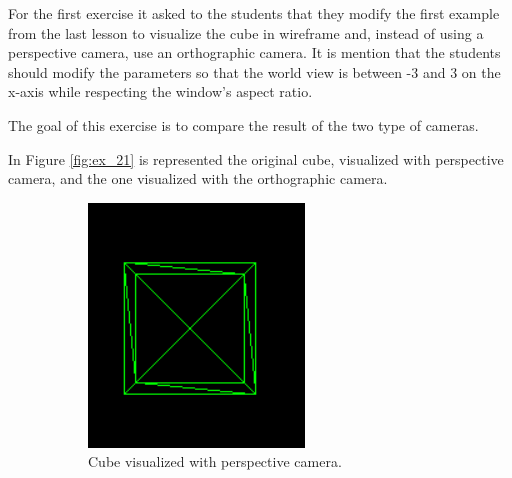 \documentclass[12pt]{article}
\begin{document}
For the first exercise it asked to the students that they modify the first example from the last lesson to visualize the cube in wireframe and, instead of using a perspective camera, use an orthographic camera.\newline
It is mention that the students should modify the parameters so that the world view is between -3 and 3 on the x-axis while respecting the window's aspect ratio.\par

The goal of this exercise is to compare the result of the two type of cameras.\par
In Figure \ref{fig:ex_21} is represented the original cube, visualized with perspective camera, and the one visualized with the orthographic camera.

\begin{figure}[!h]
\centering
    \begin{subfigure}{.5\textwidth}
        \centering
        \includegraphics[width = \textwidth]{figs/ex_21_1.png}
        \caption{Cube visualized with perspective camera.}
        \label{fig:ex_21_1}
    \end{subfigure}%
    \begin{subfigure}{.5\textwidth}

\end{subfigure}
\end{figure}
\end{document}
